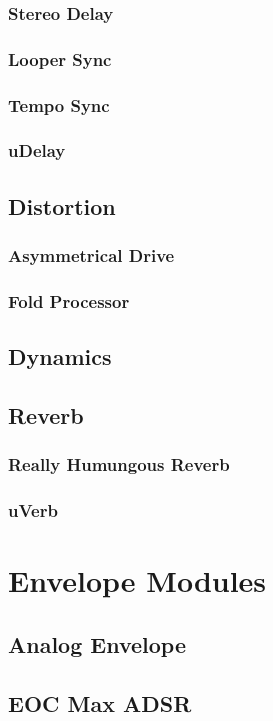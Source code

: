 \documentclass[11pt]{book}
\begin{document}
\subsection{Stereo Delay}
\subsection{Looper Sync}
\subsection{Tempo Sync}
\subsection{uDelay}
\section{Distortion}
\subsection{Asymmetrical Drive}
\subsection{Fold Processor}
\section{Dynamics}
\section{Reverb}
\subsection{Really Humungous Reverb}
\subsection{uVerb}

\chapter{Envelope Modules}
\section{Analog Envelope}
\section{EOC Max ADSR}
\end{document}
